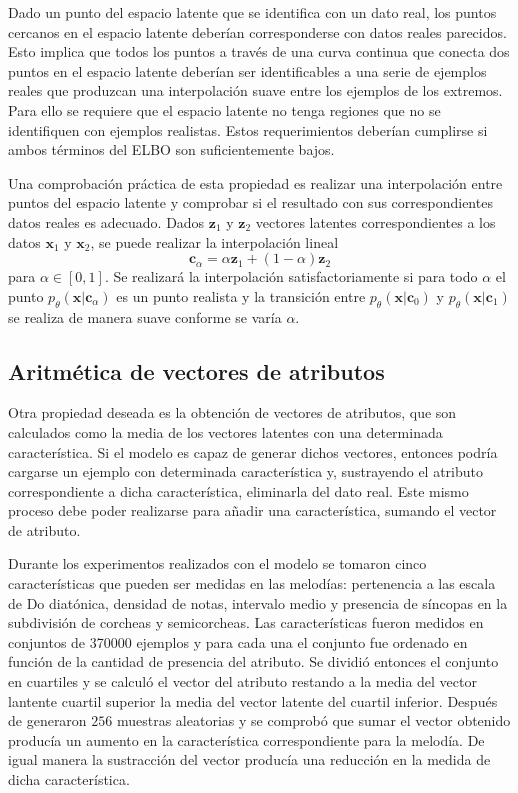 Dado un punto del espacio latente que se identifica con un dato real, los puntos cercanos en el espacio latente deberían corresponderse con datos reales parecidos. Esto implica que todos los puntos a través de una curva continua que conecta dos puntos en el espacio latente deberían ser identificables a una serie de ejemplos reales que produzcan una interpolación suave entre los ejemplos de los extremos. Para ello se requiere que el espacio latente no tenga regiones que no se identifiquen con ejemplos realistas. Estos requerimientos deberían cumplirse si ambos términos del ELBO son suficientemente bajos.

Una comprobación práctica de esta propiedad es realizar una interpolación entre puntos del espacio latente y comprobar si el resultado con sus correspondientes datos reales es adecuado. Dados $\textbf{z}_1$ y $\textbf{z}_2$ vectores latentes correspondientes a los datos $\textbf{x}_1$ y $\textbf{x}_2$, se puede realizar la interpolación lineal $$\textbf{c}_{\alpha} = \alpha \textbf{z}_1 + (1 - \alpha)\textbf{z}_2$$ para $\alpha \in [0,1]$. Se realizará la interpolación satisfactoriamente si para todo $\alpha$ el punto $p_\theta(\textbf{x} \vert \textbf{c}_\alpha)$ es un punto realista y la transición entre $p_\theta(\textbf{x} \vert \textbf{c}_0)$ y $p_\theta(\textbf{x} \vert \textbf{c}_1)$ se realiza de manera suave conforme se varía $\alpha$.

\subsection{Aritmética de vectores de atributos}

Otra propiedad deseada es la obtención de vectores de atributos, que son calculados como la media de los vectores latentes con una determinada característica. Si el modelo es capaz de generar dichos vectores, entonces podría cargarse un ejemplo con determinada característica y, sustrayendo el atributo correspondiente a dicha característica, eliminarla del dato real. Este mismo proceso debe poder realizarse para añadir una característica, sumando el vector de atributo.

Durante los experimentos realizados con el modelo se tomaron cinco características que pueden ser medidas en las melodías: pertenencia a las escala de Do diatónica, densidad de notas, intervalo medio y presencia de síncopas en la subdivisión de corcheas y semicorcheas. Las características fueron medidos en conjuntos de 370000 ejemplos y para cada una el conjunto fue ordenado en función de la cantidad de presencia del atributo. Se dividió entonces el conjunto en cuartiles y se calculó el vector del atributo restando a la media del vector lantente cuartil superior la media del vector latente del cuartil inferior. Después de generaron $256$ muestras aleatorias y se comprobó que sumar el vector obtenido producía un aumento en la característica correspondiente para la melodía. De igual manera la sustracción del vector producía una reducción en la medida de dicha característica.

\endinput
